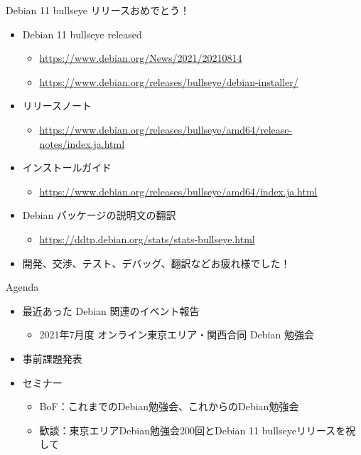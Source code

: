 \begin{frame}{Debian 11 bullseye リリースおめでとう！}
  \begin{itemize}
  \item Debian 11 bullseye released
    \begin{itemize}
    \item \url{https://www.debian.org/News/2021/20210814}
    \item \url{https://www.debian.org/releases/bullseye/debian-installer/}
    \end{itemize}
  \item リリースノート
    \begin{itemize}
    \item \url{https://www.debian.org/releases/bullseye/amd64/release-notes/index.ja.html}
    \end{itemize}
  \item インストールガイド
    \begin{itemize}
    \item \url{https://www.debian.org/releases/bullseye/amd64/index.ja.html}
    \end{itemize}
  \item Debian パッケージの説明文の翻訳
    \begin{itemize}
    \item \url{https://ddtp.debian.org/stats/stats-bullseye.html}
    \end{itemize}
  \item 開発、交渉、テスト、デバッグ、翻訳などお疲れ様でした！
  \end{itemize}
\end{frame}


\begin{frame}{Agenda}
 \begin{minipage}[t]{0.45\hsize}
  \begin{itemize}
  \item 最近あった Debian 関連のイベント報告
    \begin{itemize}
    \item 2021年7月度 オンライン東京エリア・関西合同 Debian 勉強会
    \end{itemize}
  \item 事前課題発表
  \end{itemize}
 \end{minipage}
 \begin{minipage}[t]{0.45\hsize}
   \begin{itemize}
   \item セミナー
     \begin{itemize}
      \item BoF：これまでのDebian勉強会、これからのDebian勉強会
      \item 歓談：東京エリアDebian勉強会200回とDebian 11 bullseyeリリースを祝して
     \end{itemize}
  \end{itemize}
 \end{minipage}
\end{frame}

